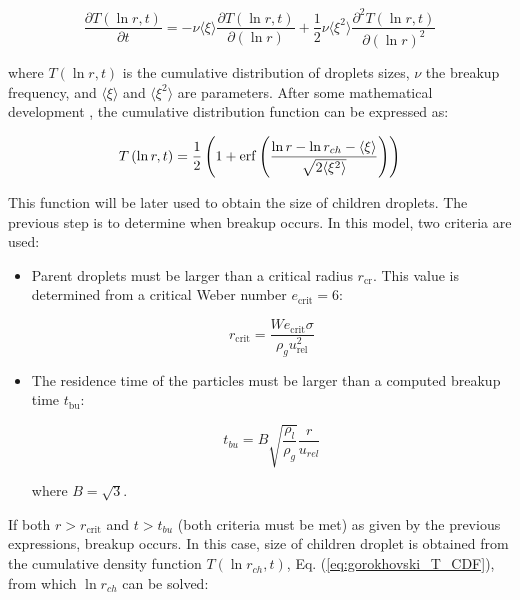 \begin{equation}
\frac{\partial T \left( \ln r, t \right)}{\partial t} = - \nu  \langle \xi \rangle  \frac{\partial T \left( \ln r, t \right)}{\partial \left( \ln r \right)} + \frac{1}{2} \nu  \langle \xi^2 \rangle  \frac{\partial^2 T \left( \ln r, t \right)}{\partial \left( \ln r \right)^2}
\end{equation}

where $T \left( \ln r, t \right)$ is the cumulative distribution of droplets sizes, $\nu$ the breakup frequency, and  $\langle \xi \rangle$ and $ \langle \xi^2 \rangle$ are parameters. After some mathematical development , the cumulative distribution function can be expressed as:

\begin{equation}
\label{eq:gorokhovski_T_CDF}
T \left( \ln r, t \right) = \frac{1}{2} \left( 1 + \operatorname{erf} \left( \frac{\ln r - \ln r_{ch} - \langle \xi \rangle }{\sqrt{2 \langle \xi^2 \rangle}}\right)  \right)
\end{equation}

This function will be later used to obtain the size of children droplets. The previous step is to determine when breakup occurs. In this model, two criteria are used:

\begin{itemize}

	\item Parent droplets must be larger than a critical radius $r_\mathrm{cr}$. This value is determined from a critical Weber number $e_\mathrm{crit} = 6$:
	
	\begin{equation}
	r_\mathrm{crit} = \frac{We_\mathrm{crit} \sigma}{\rho_g u_\mathrm{rel}^2}
	\end{equation}
	
	\item The residence time of the particles must be larger than a computed breakup time $t_\mathrm{bu}$:
	
	\begin{equation}
	t_{bu} = B \sqrt{\frac{\rho_l}{\rho_g}} \frac{r}{u_{rel}}
	\end{equation}
	
	where $B = \sqrt{3}$.

\end{itemize}

If both $r > r_\mathrm{crit}$ and $t > t_{bu}$ (both criteria must be met) as given by the previous expressions, breakup occurs. In this case, size of children droplet is obtained from the cumulative density function $T \left( \ln r_{ch}, t \right)$, Eq. (\ref{eq:gorokhovski_T_CDF}), from which $\ln r_{ch}$ can be solved:
 
